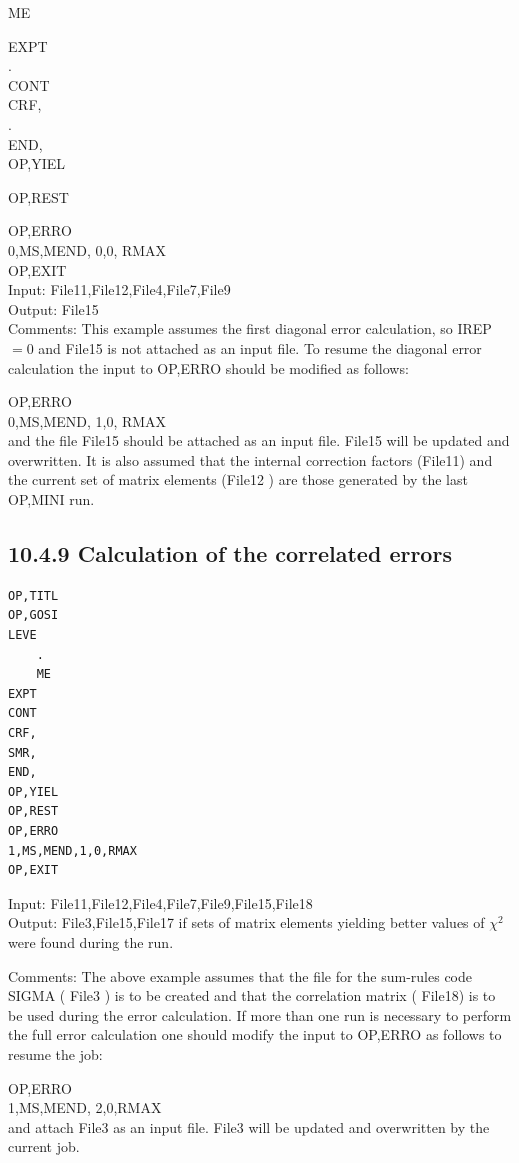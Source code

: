 \documentclass[10pt]{article}
\begin{document}
ME

EXPT\\
.\\
CONT\\
CRF,\\
.\\
END,\\
OP,YIEL

OP,REST

OP,ERRO\\
0,MS,MEND, 0,0, RMAX\\
OP,EXIT\\
Input: File11,File12,File4,File7,File9\\
Output: File15\\
Comments: This example assumes the first diagonal error calculation, so IREP $=0$ and File15 is not attached as an input file. To resume the diagonal error calculation the input to OP,ERRO should be modified as follows:

OP,ERRO\\
0,MS,MEND, 1,0, RMAX\\
and the file File15 should be attached as an input file. File15 will be updated and overwritten. It is also assumed that the internal correction factors (File11) and the current set of matrix elements (File12 ) are those generated by the last OP,MINI run.

\subsection*{10.4.9 Calculation of the correlated errors}
\begin{verbatim}
OP,TITL
OP,GOSI
LEVE
    .
    ME
EXPT
CONT
CRF,
SMR,
END,
OP,YIEL
OP,REST
OP,ERRO
1,MS,MEND,1,0,RMAX
OP,EXIT
\end{verbatim}

Input: File11,File12,File4,File7,File9,File15,File18\\
Output: File3,File15,File17 if sets of matrix elements yielding better values of $\chi^{2}$ were found during the run.

Comments: The above example assumes that the file for the sum-rules code SIGMA ( File3 ) is to be created and that the correlation matrix ( File18) is to be used during the error calculation. If more than one run is necessary to perform the full error calculation one should modify the input to OP,ERRO as follows to resume the job:

OP,ERRO\\
1,MS,MEND, 2,0,RMAX\\
and attach File3 as an input file. File3 will be updated and overwritten by the current job.
\end{document}
